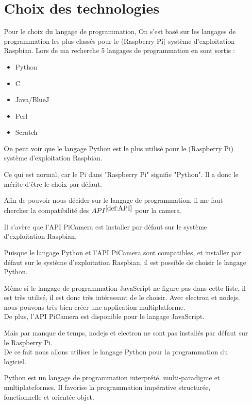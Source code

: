     \section{Choix des technologies}
        Pour le choix du langage de programmation, On s'est basé sur les langages de programmation les plus classés pour le (Raspberry Pi) système d'exploitation Raspbian.
        Lors de ma recherche 5 langages de programmation en sont sortis : 

        \vspace{0.2cm}

        \begin{itemize}
            \item Python
            \item C
            \item Java/BlueJ
            \item Perl
            \item Scratch
        \end{itemize}

        \begin{flushleft}
            On peut voir que le langage Python est le plus utilisé pour le (Raspberry Pi) système d'exploitation Raspbian.

            Ce qui est normal, car le Pi dans "Raspberry Pi" signifie "Python". Il a donc le mérite d'être le choix par défaut.

            Afin de pouvoir nous décider sur le langage de programmation, il me faut chercher la compatibilité des \underline{$API^{\ref{def:API}}$} pour la camera. 

            Il s'avère que l'API PiCamera est installer par défaut sur le système d'exploitation Raspbian.

            Puisque le langage Python et l'API PiCamera sont compatibles, et installer par défaut sur le système d'exploitation Raspbian, il est possible de choisir le langage Python.
        
            Même si le langage de programmation JavaScript ne figure pas dans cette liste, il est très utilisé, il est donc très intéressant de le choisir.
            Avec electron et nodejs, nous pouvons très bien créer une application multiplatforme.\\[0.2cm]
            De plus, l'API PiCamera est disponible pour le langage JavaScript.
        
            Mais par manque de temps, nodejs et electron ne sont pas installés par défaut sur le Raspberry Pi.\\[0.2cm]
        
            De ce fait nous allons utiliser le langage Python pour la programmation du logiciel.
            
            Python est un langage de programmation interprété, multi-paradigme et multiplateformes. Il favorise la programmation impérative structurée, fonctionnelle et orientée objet.
            
        \end{flushleft}

